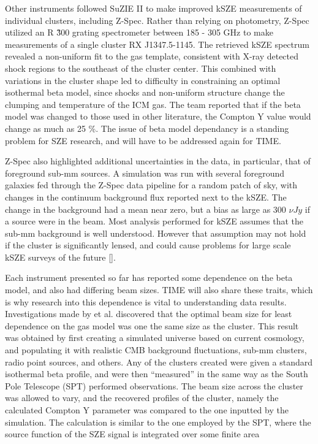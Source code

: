 \documentclass[manuscript]{aastex}
\begin{document}
Other instruments followed SuZIE II to make improved kSZE measurements of individual clusters, including Z-Spec. Rather than relying on photometry, Z-Spec utilized an R \~ 300 grating spectrometer between 185 - 305 GHz to make measurements of a single cluster RX J1347.5-1145. The retrieved kSZE spectrum revealed a non-uniform fit to the gas template, consistent with X-ray detected shock regions to the southeast of the cluster center. This combined with variations in the cluster shape led to difficulty in constraining an optimal isothermal beta model, since shocks and non-uniform structure change the clumping and temperature of the ICM gas. The team reported that if the beta model was changed to those used in other literature, the Compton Y value would change as much as 25 \%. The issue of beta model dependancy is a standing problem for SZE research, and will have to be addressed again for TIME.

Z-Spec also highlighted additional uncertainties in the data, in particular, that of foreground sub-mm sources. A simulation was run with several foreground galaxies fed through the Z-Spec data pipeline for a random patch of sky, with changes in the continuum background flux reported next to the kSZE. The change in the background had a mean near zero, but a bias as large as 300 $\nu Jy$ if a source were in the beam. Most analysis performed for kSZE assumes that the sub-mm background is well understood. However that assumption may not hold if the cluster is significantly lensed, and could cause problems for large scale kSZE surveys of the future [\cite{Zemcov2012}].

Each instrument presented so far has reported some dependence on the beta model, and also had differing beam sizes. TIME will also share these traits, which is why research into this dependence is vital to understanding data results. Investigations made by \cite{Saliwanchik2015} et al. discovered that the optimal beam size for least dependence on the gas model was one the same size as the cluster. This result was obtained by first creating a simulated universe based on current cosmology, and populating it with realistic CMB background fluctuations, sub-mm clusters, radio point sources, and others. Any of the clusters created were given a standard isothermal beta profile, and were then ``measured'' in the same way as the South Pole Telescope (SPT) performed observations. The beam size across the cluster was allowed to vary, and the recovered profiles of the cluster, namely the calculated Compton Y parameter was compared to the one inputted by the simulation. The calculation is similar to the one employed by the SPT, where the source function of the SZE signal is integrated over some finite area
\end{document}

